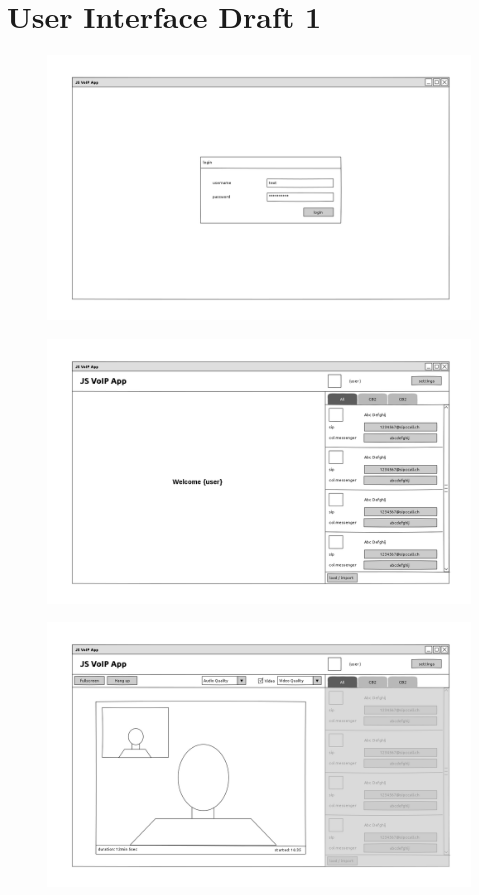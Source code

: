 \chapter{User Interface Draft 1}
\begin{landscape}
	\begin{figure}[H]
		\centering
		\includegraphics[width=1.4\textwidth]{../ui/img/login_page.png}
		\label{login screen}
	\end{figure}
	\begin{figure}[H]
		\centering
		\includegraphics[width=1.4\textwidth]{../ui/img/main_view.png}
		\label{main screen}
	\end{figure}
	\begin{figure}[H]
		\centering
		\includegraphics[width=1.4\textwidth]{../ui/img/call_view.png}

\end{figure}
\end{landscape}

